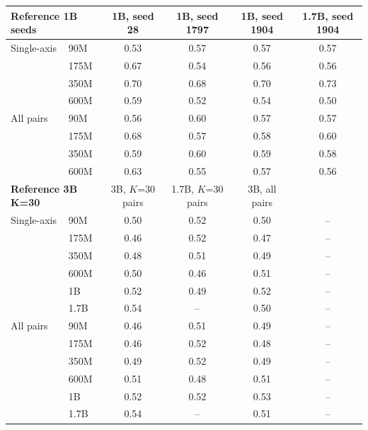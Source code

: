 \begin{tabular}{llcccc}
\toprule
\multicolumn{2}{l}{\textbf{Reference 1B seeds}} & 1B, seed 28 & 1B, seed 1797 & 1B, seed 1904 & 1.7B, seed 1904 \\
\midrule
Single-axis & 90M & 0.53 & 0.57 & 0.57 & 0.57 \\
 & 175M & 0.67 & 0.54 & 0.56 & 0.56 \\
 & 350M & 0.70 & 0.68 & 0.70 & 0.73 \\
 & 600M & 0.59 & 0.52 & 0.54 & 0.50 \\
All pairs & 90M & 0.56 & 0.60 & 0.57 & 0.57 \\
 & 175M & 0.68 & 0.57 & 0.58 & 0.60 \\
 & 350M & 0.59 & 0.60 & 0.59 & 0.58 \\
 & 600M & 0.63 & 0.55 & 0.57 & 0.56 \\
\midrule
\multicolumn{2}{l}{\textbf{Reference 3B K=30}} & 3B, $K$=30 pairs & 1.7B, $K$=30 pairs & 3B, all pairs &  \\
\midrule
Single-axis & 90M & 0.50 & 0.52 & 0.50 & -- \\
 & 175M & 0.46 & 0.52 & 0.47 & -- \\
 & 350M & 0.48 & 0.51 & 0.49 & -- \\
 & 600M & 0.50 & 0.46 & 0.51 & -- \\
 & 1B & 0.52 & 0.49 & 0.52 & -- \\
 & 1.7B & 0.54 & -- & 0.50 & -- \\
All pairs & 90M & 0.46 & 0.51 & 0.49 & -- \\
 & 175M & 0.46 & 0.52 & 0.48 & -- \\
 & 350M & 0.49 & 0.52 & 0.49 & -- \\
 & 600M & 0.51 & 0.48 & 0.51 & -- \\
 & 1B & 0.52 & 0.52 & 0.53 & -- \\
 & 1.7B & 0.54 & -- & 0.51 & -- \\
\bottomrule
\end{tabular}
